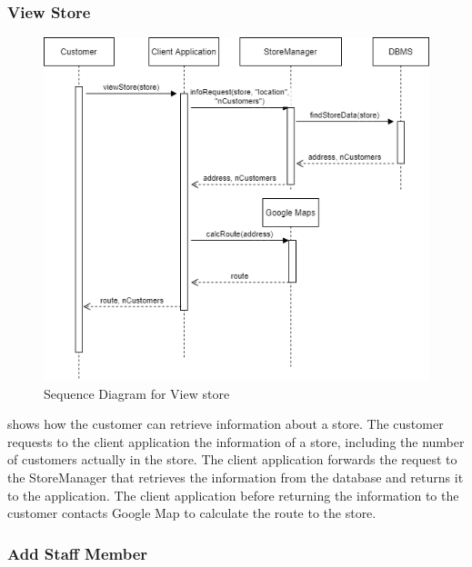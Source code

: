 \subsubsection{View Store} %
\begin{figure}[H]
    \centering
    \includegraphics[height=0.6\textwidth]{Images/CustomerSequenceDiagrams/ViewStoreSequenceDiagram.png}
    \caption{Sequence Diagram for View store}
    \label{fig:SDViewStore}
\end{figure}
 shows how the customer can retrieve information about a store.
The customer requests to the client application the information of a store, including the number of customers actually in the store.
The client application forwards the request to the StoreManager that retrieves the information from the database and returns it to the application.
The client application before returning the information to the customer contacts Google Map to calculate the route to the store.

\subsubsection{Add Staff Member}

